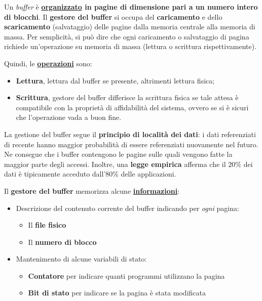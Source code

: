 \documentclass[a4paper]{article}
\begin{document}
	\noindent
	Un \emph{buffer} è \textbf{\underline{organizzato} in pagine di dimensione pari a un numero intero di blocchi}. Il \textbf{gestore del buffer} si occupa del \textbf{caricamento} e dello \textbf{scaricamento} (salvataggio) delle pagine dalla memoria centrale alla memoria di massa. Per semplicità, si può dire che ogni caricamento o salvataggio di pagina richiede un'operazione su memoria di massa (lettura o scrittura rispettivamente).\newline
	
	\noindent
	Quindi, le \underline{\textbf{operazioni}} sono:
	\begin{itemize}
		\item \textbf{Lettura}, lettura dal buffer se presente, altrimenti lettura fisica;
		\item \textbf{Scrittura}, gestore del buffer differisce la scrittura fisica se tale attesa è compatibile con la proprietà di affidabilità del sistema, ovvero se si è sicuri che l'operazione vada a buon fine.
	\end{itemize}
	La gestione del buffer segue il \textcolor{Red3}{\textbf{principio di località dei dati}}: i dati referenziati di recente hanno maggior probabilità di essere referenziati nuovamente nel futuro. Ne consegue che i buffer contengono le pagine sulle quali vengono fatte la maggior parte degli accessi. Inoltre, una \textbf{legge empirica} afferma che il $20\%$ dei dati è tipicamente acceduto dall'$80\%$ delle applicazioni.\newline
	
	\noindent
	Il \textbf{gestore del buffer} memorizza alcune \underline{\textbf{informazioni}}:
	\begin{itemize}
		\item Descrizione del contenuto corrente del buffer indicando per \emph{ogni} pagina:
		\begin{itemize}
			\item Il \textbf{file fisico}
			\item Il \textbf{numero di blocco}
		\end{itemize}

		\item Mantenimento di alcune variabili di stato:
		\begin{itemize}
			\item \textbf{Contatore} per indicare quanti programmi utilizzano la pagina
			\item \textbf{Bit di stato} per indicare se la pagina è stata modificata
		\end{itemize}
	\end{itemize}\newpage
\end{document}
